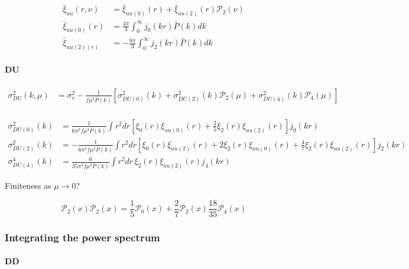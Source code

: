 \documentclass[a4paper,11pt, fleqn]{article}
\begin{document}
\begin{align}
  \bar{\xi}_{uu}(r, \nu) &= \bar{\xi}_{uu(0)}(r) + \bar{\xi}_{uu(2)}(r) \mathcal{P}_2(\nu)\\
  \bar{\xi}_{uu(0)}(r) &= \frac{4\pi}{3} \int_0^\infty \!
                       j_0(kr) \bar{P}(k) dk\\
  \bar{\xi}_{uu(2)(r)} &= -\frac{8\pi}{3} \int_0^\infty \!
                       j_2(kr) \bar{P}(k) dk
\end{align}

%
%
\paragraph{DU}
%
\begin{align}
  \sigma^2_{DU}(k, \mu) &= \sigma_v^2 - \frac{1}{f\mu^2 \bar{P}(k)}
  \left[
    \sigma^2_{DU(0)}(k) + \sigma^2_{DU(2)}(k) \mathcal{P}_2(\mu)
    + \sigma^2_{DU(4)}(k) \mathcal{P}_4(\mu)
    \right]\\
\end{align}


\begin{align}
  \sigma^2_{DU(0)}(k) &= \frac{1}{6\pi^2 f\mu^2\bar{P}(k)} \int\! r^2 dr \left[
    \xi_0(r) \xi_{uu(0)}(r) + \frac{2}{5} \xi_2(r) \xi_{uu(2)}(r)
    \right] j_0(kr)\\
  \sigma^2_{DU(2)}(k) &= -\frac{1}{6\pi^2 f\mu^2 \bar{P}(k)} \int\! r^2 dr \left[
    \xi_0(r) \xi_{uu(2)}(r) + 2 \xi_2(r) \xi_{uu(0)}(r) + \frac{4}{7} \xi_2(r) \xi_{uu(2)}(r)
    \right] j_2(kr)\\
  \sigma^4_{DU(4)}(k) &= \frac{6}{35\pi^2 f\mu^2 \bar{P}(k)} \int\! r^2 dr \,
  \xi_2(r) \xi_{uu(2)}(r) j_4(kr)    
\end{align}

Finiteness as $\mu \rightarrow 0$?

\begin{equation}
  \mathcal{P}_2(x) \mathcal{P}_2(x)
  = \frac{1}{5} \mathcal{P}_0(x) + \frac{2}{7} \mathcal{P}_2(x)
    \frac{18}{35} \mathcal{P}_4(x)
\end{equation}

\clearpage

%
%
\clearpage
\subsubsection{Integrating the power spectrum}

\paragraph{DD}
\end{document}
